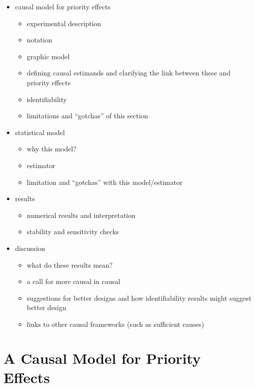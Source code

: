 \documentclass[]{article}
\providecommand{\tightlist}{%
  \setlength{\itemsep}{0pt}\setlength{\parskip}{0pt}}
\begin{document}
\begin{itemize}
\tightlist
\item
  causal model for priority effects

  \begin{itemize}
  \tightlist
  \item
    experimental description
  \item
    notation
  \item
    graphic model
  \item
    defining causal estimands and clarifying the link between these and
    priority effects
  \item
    identifiability
  \item
    limitations and ``gotchas'' of this section
  \end{itemize}
\item
  statistical model

  \begin{itemize}
  \tightlist
  \item
    why this model?
  \item
    estimator
  \item
    limitation and ``gotchas'' with this model/estimator
  \end{itemize}
\item
  results

  \begin{itemize}
  \tightlist
  \item
    numerical results and interpretation
  \item
    stability and sensitivity checks
  \end{itemize}
\item
  discussion

  \begin{itemize}
  \tightlist
  \item
    what do these results mean?
  \item
    a call for more causal in causal
  \item
    suggestions for better designs and how identifiability results might
    suggest better design
  \item
    links to other causal frameworks (such as sufficient causes)
  \end{itemize}
\end{itemize}

\hypertarget{a-causal-model-for-priority-effects}{%
\section{A Causal Model for Priority
Effects}\label{a-causal-model-for-priority-effects}}
\end{document}

